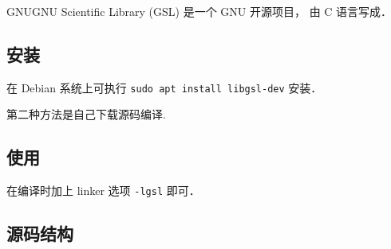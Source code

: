 
\begin{issues}
\issueDraft
\issueMissDepend
\end{issues}

GNUGNU Scientific Library (GSL) 是一个 GNU 开源项目， 由 C 语言写成．

\subsection{安装}
在 Debian 系统上可执行 \verb|sudo apt install libgsl-dev| 安装．

第二种方法是自己下载源码编译.

\subsection{使用}
在编译时加上 linker 选项 \verb|-lgsl| 即可．

\subsection{源码结构}
